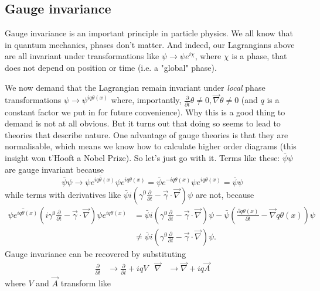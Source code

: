 \subsection{Gauge invariance}
Gauge invariance is an important principle in particle physics. We all know that in quantum mechanics, phases don't matter. And indeed, our Lagrangians above are all invariant under transformations like $\psi \to \psi e^{i\chi}$, where $\chi$ is a phase, that does not depend on position or time (i.e. a "global" phase).

We now demand that the Lagrangian remain invariant under \emph{local} phase transformations $\psi \to \psi^{iq \theta(x)}$ where, importantly, $\frac{\partial}{\partial t} \theta \neq 0, \vec{\nabla} \theta \neq 0$ (and $q$ is a constant factor we put in for future convenience). Why this is a good thing to demand is not at all obvious. But it turns out that doing so seems to lead to theories that describe nature. One advantage of gauge theories is that they are normalisable, which means we know how to calculate higher order diagrams (this insight won t'Hooft a Nobel Prize). So let's just go with it. Terms like these:
\(
\overline{\psi} \psi
\)
are gauge invariant because
\begin{equation}
\overline{\psi} \psi \to
\overline{\psi e^{iq\theta(x)}} \psi e^{iq\theta(x)}
=\overline{\psi} e^{-iq \theta(x)} \psi e^{iq\theta(x)}
=\overline{\psi} \psi
\end{equation}
while terms with derivatives like
\(
\bar{\psi} i\left(\gamma^0\frac{\partial}{\partial t}-\vec{\gamma}\cdot \vec{\nabla}\right)\psi
\)
are not, because
\begin{align}
\overline{\psi e^{iq\theta(x)}} \left(i\gamma^0\frac{\partial}{\partial t}-\vec{\gamma}\cdot \vec{\nabla}\right)\psi e^{iq\theta(x)}
& =
\bar{\psi} i\left(\gamma^0\frac{\partial}{\partial t}-\vec{\gamma}\cdot \vec{\nabla}\right)\psi
- \bar{\psi} \left(\frac{\partial q\theta(x)}{\partial t} - \vec{\nabla}q \theta(x)\right)\psi
\\
&\neq 
\bar{\psi} i\left(\gamma^0\frac{\partial}{\partial t}-\vec{\gamma}\cdot \vec{\nabla}\right)\psi .
\end{align}
Gauge invariance can be recovered by substituting 
\begin{align}
\label{eq:recoverGaugeInvariance}
    \frac{\partial}{\partial t} &\to 
    \frac{\partial}{\partial t} + i q V
    &
    \vec{\nabla} &\to
    \vec{\nabla} + iq \vec{A}
\end{align}
where $V$ and $\vec{A}$ transform like
